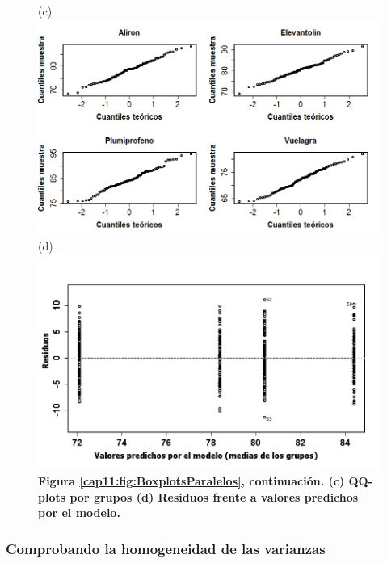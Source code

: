 \begin{figure}[p]
\begin{center}
(c)\\
\includegraphics[width=14cm]{../fig/Cap11-EjemploFrailecillosQQplotsGrupos.png}\\[3mm]
(d)\\
\includegraphics[width=13cm]{../fig/Cap11-EjemploFrailecillos-ResidualsVsFitted.png}\\
{\bf Figura \ref{cap11:fig:BoxplotsParalelos}, continuación. (c) QQ-plots por grupos (d) Residuos frente a valores predichos por el modelo.}
\end{center}
\end{figure}


\subsubsection{Comprobando la homogeneidad de las varianzas}
\label{cap11:subsubsec:ComprobandoHipotesisHomogeneidadVArianzasAnova}


